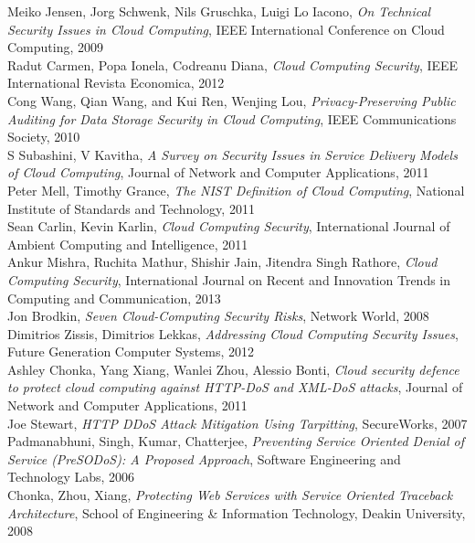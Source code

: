 \documentclass[a4paper, 8pt]{article} %
\begin{document}
\begin{thebibliography}{1}
Meiko Jensen, Jorg Schwenk, Nils Gruschka, Luigi Lo Iacono, \emph{On Technical Security Issues in Cloud Computing}, \relax IEEE International Conference on Cloud Computing, 2009\\
Radut Carmen, Popa Ionela, Codreanu Diana, \emph{Cloud Computing Security}, \relax IEEE International Revista Economica, 2012\\
Cong Wang, Qian Wang, and Kui Ren, Wenjing Lou, \emph{Privacy-Preserving Public Auditing for Data Storage Security in Cloud Computing}, \relax IEEE Communications Society, 2010\\
S Subashini, V Kavitha, \emph{A Survey on Security Issues in Service Delivery Models of Cloud Computing}, \relax Journal of Network and Computer Applications, 2011\\
Peter Mell, Timothy Grance, \emph{The NIST Definition of Cloud Computing}, \relax National Institute of Standards and Technology, 2011\\
Sean Carlin, Kevin Karlin, \emph{Cloud Computing Security}, \relax International Journal of Ambient Computing and Intelligence, 2011\\
Ankur Mishra, Ruchita Mathur, Shishir Jain, Jitendra Singh Rathore, \emph{Cloud Computing Security}, \relax International Journal on Recent and Innovation Trends in Computing and Communication, 2013\\
Jon Brodkin, \emph{Seven Cloud-Computing Security Risks}, \relax Network World, 2008\\
Dimitrios Zissis, Dimitrios Lekkas, \emph{Addressing Cloud Computing Security Issues}, \relax Future Generation Computer Systems, 2012\\
Ashley Chonka, Yang Xiang, Wanlei Zhou, Alessio Bonti, \emph{Cloud security defence to protect cloud computing against HTTP-DoS and XML-DoS attacks}, \relax Journal of Network and Computer Applications, 2011\\
Joe Stewart, \emph{HTTP DDoS Attack Mitigation Using Tarpitting}, \relax SecureWorks, 2007\\
Padmanabhuni, Singh, Kumar, Chatterjee, \emph{Preventing Service Oriented Denial of Service (PreSODoS): A Proposed Approach}, \relax Software Engineering and Technology Labs, 2006\\
Chonka, Zhou, Xiang, \emph{Protecting Web Services with Service Oriented Traceback Architecture}, \relax School of Engineering \& Information Technology, Deakin University, 2008\\

\end{thebibliography}
\end{document}
